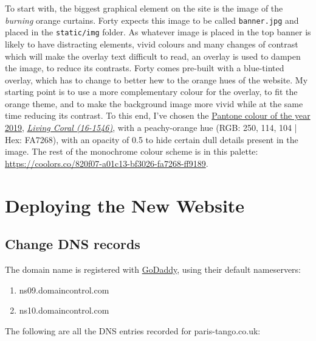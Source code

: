 \documentclass{article}
\begin{document}
To start with, the biggest graphical element on the site is the image of the
\emph{burning} orange curtains. Forty expects this image to be called \texttt{banner.jpg}
and placed in the \texttt{static/img} folder. As whatever image is placed in the top
banner is likely to have distracting elements, vivid colours and many changes of
contrast which will make the overlay text difficult to read, an overlay is used
to dampen the image, to reduce its contrasts. Forty comes pre-built with a
blue-tinted overlay, which has to change to better hew to the orange hues of the
website. My starting point is to use a more complementary colour for the
overlay, to fit the orange theme, and to make the background image more vivid
while at the same time reducing its contrast. To this end, I've chosen the
\href{https://www.pantone.com/color-intelligence/color-of-the-year/color-of-the-year-2019}{Pantone colour of the year 2019}, \emph{\href{https://www.pantone.com/color-finder/16-1546-TPX}{Living Coral (16-1546)}}, with a peachy-orange
hue (RGB: 250, 114, 104 | Hex: FA7268), with an opacity of 0.5 to hide certain
dull details present in the image. The rest of the monochrome colour scheme is
in this palette: \url{https://coolors.co/820f07-a01c13-bf3026-fa7268-ff9189}.

\section{Deploying the New Website}
\label{sec:org6988b37}
\subsection{Change DNS records}
\label{sec:orga46cdb7}
The domain name is registered with \href{https://godaddy.com/}{GoDaddy}, using their default nameservers:

\begin{enumerate}
\item ns09.domaincontrol.com
\item ns10.domaincontrol.com
\end{enumerate}

The following are all the DNS entries recorded for paris-tango.co.uk:
\end{document}
